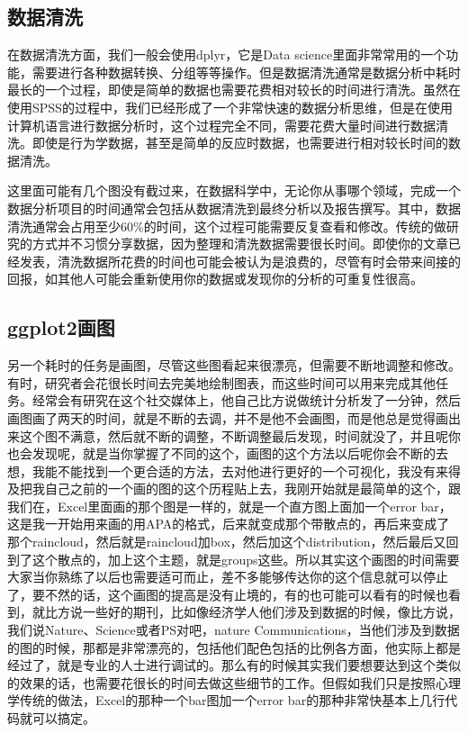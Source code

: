 \documentclass[
  oneside]{book}
\begin{document}
\hypertarget{ux6570ux636eux6e05ux6d17}{%
\subsection{数据清洗}\label{ux6570ux636eux6e05ux6d17}}

在数据清洗方面，我们一般会使用dplyr，它是Data science里面非常常用的一个功能，需要进行各种数据转换、分组等等操作。但是数据清洗通常是数据分析中耗时最长的一个过程，即使是简单的数据也需要花费相对较长的时间进行清洗。虽然在使用SPSS的过程中，我们已经形成了一个非常快速的数据分析思维，但是在使用计算机语言进行数据分析时，这个过程完全不同，需要花费大量时间进行数据清洗。即使是行为学数据，甚至是简单的反应时数据，也需要进行相对较长时间的数据清洗。

这里面可能有几个图没有截过来，在数据科学中，无论你从事哪个领域，完成一个数据分析项目的时间通常会包括从数据清洗到最终分析以及报告撰写。其中，数据清洗通常会占用至少60\%的时间，这个过程可能需要反复查看和修改。传统的做研究的方式并不习惯分享数据，因为整理和清洗数据需要很长时间。即使你的文章已经发表，清洗数据所花费的时间也可能会被认为是浪费的，尽管有时会带来间接的回报，如其他人可能会重新使用你的数据或发现你的分析的可重复性很高。

\hypertarget{ggplot2ux753bux56fe}{%
\subsection{ggplot2画图}\label{ggplot2ux753bux56fe}}

另一个耗时的任务是画图，尽管这些图看起来很漂亮，但需要不断地调整和修改。有时，研究者会花很长时间去完美地绘制图表，而这些时间可以用来完成其他任务。经常会有研究在这个社交媒体上，他自己比方说做统计分析发了一分钟，然后画图画了两天的时间，就是不断的去调，并不是他不会画图，而是他总是觉得画出来这个图不满意，然后就不断的调整，不断调整最后发现，时间就没了，并且呢你也会发现呢，就是当你掌握了不同的这个，画图的这个方法以后呢你会不断的去想，我能不能找到一个更合适的方法，去对他进行更好的一个可视化，我没有来得及把我自己之前的一个画的图的这个历程贴上去，我刚开始就是最简单的这个，跟我们在，Excel里面画的那个图是一样的，就是一个直方图上面加一个error bar，这是我一开始用来画的用APA的格式，后来就变成那个带散点的，再后来变成了那个raincloud，然后就是raincloud加box，然后加这个distribution，然后最后又回到了这个散点的，加上这个主题，就是groups这些。所以其实这个画图的时间需要大家当你熟练了以后也需要适可而止，差不多能够传达你的这个信息就可以停止了，要不然的话，这个画图的提高是没有止境的，有的也可能可以看有的时候也看到，就比方说一些好的期刊，比如像经济学人他们涉及到数据的时候，像比方说，我们说Nature、Science或者PS对吧，nature Communications，当他们涉及到数据的图的时候，那都是非常漂亮的，包括他们配色包括的比例各方面，他实际上都是经过了，就是专业的人士进行调试的。那么有的时候其实我们要想要达到这个类似的效果的话，也需要花很长的时间去做这些细节的工作。但假如我们只是按照心理学传统的做法，Excel的那种一个bar图加一个error bar的那种非常快基本上几行代码就可以搞定。
\end{document}
